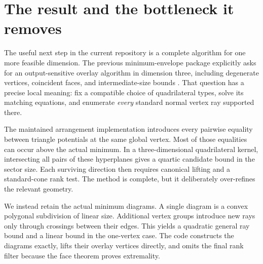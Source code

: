 \documentclass[11pt,letterpaper]{article}
\theoremstyle{definition}
\theoremstyle{remark}\newtheorem{remark}[theorem]{Remark}
\begin{document}
\newpage
\tableofcontents
\newpage

\section{The result and the bottleneck it removes}
\label{sec:overview}

The useful next step in the current repository is a complete algorithm for
one more feasible dimension. The previous minimum-envelope package explicitly
asks for an output-sensitive overlay algorithm in dimension three, including
degenerate vertices, coincident faces, and intermediate-size bounds
\cite{minimumenvelopes}. That question has a precise local meaning: fix a
compatible choice of quadrilateral types, solve its matching equations, and
enumerate \emph{every} standard normal vertex ray supported there.

The maintained arrangement implementation introduces every pairwise equality
between triangle potentials at the same global vertex. Most of those
equalities can occur above the actual minimum. In a three-dimensional
quadrilateral kernel, intersecting all pairs of these hyperplanes gives a
quartic candidate bound in the sector size. Each surviving direction then
requires canonical lifting and a standard-cone rank test. The method is
complete, but it deliberately over-refines the relevant geometry.

We instead retain the actual minimum diagrams. A single diagram is a convex
polygonal subdivision of linear size. Additional vertex groups introduce
new rays only through crossings between their edges. This yields a quadratic
general ray bound and a linear bound in the one-vertex case. The code
constructs the diagrams exactly, lifts their overlay vertices directly, and
omits the final rank filter because the face theorem proves extremality.
\end{document}
